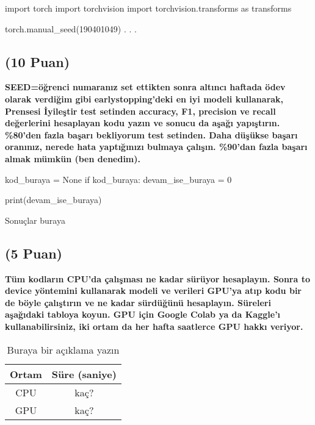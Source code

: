 \documentclass[11pt]{article}
\begin{document}
\begin{python}
import torch
import torchvision
import torchvision.transforms as transforms

torch.manual_seed(190401049)
.
.
.

\end{python}

\begin{comment}
\begin{figure}[ht!]
    \centering
    \texttt{[image: mypicturehere.png]}
    \caption{Buraya açıklama yazın}
    \label{fig:my_pic}
\end{figure}
\end{comment}

\subsection{(10 Puan)} \textbf{SEED=öğrenci numaranız set ettikten sonra altıncı haftada ödev olarak verdiğim gibi earlystopping'deki en iyi modeli kullanarak, Prensesi İyileştir test setinden accuracy, F1, precision ve recall değerlerini hesaplayan kodu yazın ve sonucu da aşağı yapıştırın. \%80'den fazla başarı bekliyorum test setinden. Daha düşükse başarı oranınız, nerede hata yaptığınızı bulmaya çalışın. \%90'dan fazla başarı almak mümkün (ben denedim).}

\begin{python}
kod_buraya = None
if kod_buraya:
    devam_ise_buraya = 0

print(devam_ise_buraya)
\end{python}

Sonuçlar buraya

\subsection{(5 Puan)} \textbf{Tüm kodların CPU'da çalışması ne kadar sürüyor hesaplayın. Sonra to device yöntemini kullanarak modeli ve verileri GPU'ya atıp kodu bir de böyle çalıştırın ve ne kadar sürdüğünü hesaplayın. Süreleri aşağıdaki tabloya koyun. GPU için Google Colab ya da Kaggle'ı kullanabilirsiniz, iki ortam da her hafta saatlerce GPU hakkı veriyor.}

\begin{table}[ht!]
    \centering
    \caption{Buraya bir açıklama yazın}
    \begin{tabular}{c|c}
        Ortam & Süre (saniye) \\\hline
        CPU & kaç? \\
        GPU & kaç?\\
    \end{tabular}
    \label{tab:my_table}
\end{table}
\end{document}
